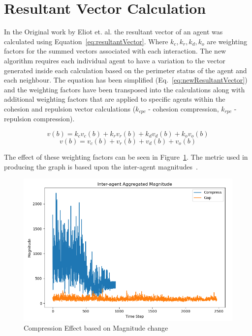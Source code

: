 \documentclass[12pt,a4paper]{article}
\begin{document}
\section{Resultant Vector Calculation}\label{resultantVector}
In the Original work by Eliot et. al. the resultant vector of an agent was calculated using Equation~\ref{eq:resultantVector}. Where $k_c,k_r,k_d,k_o$ are weighting factors for the summed vectors associated with each interaction. The new algorithm requires each individual agent to have a variation to the vector generated inside each calculation based on the perimeter status of the agent and each neighbour. The equation has been simplified (Eq.~\ref{eq:newResultantVector}) and the weighting factors have been transposed into the calculations along with additional weighting factors that are applied to specific agents within the cohesion and repulsion vector calculations ($k_{cpc}$ - cohesion compression, $k_{rpc}$ - repulsion compression).

\begin{equation}\label{eq:resultantVector}
	v(b) = k_cv_c(b) + k_rv_r(b) + k_dv_d(b) + k_ov_o(b)
\end{equation}
\begin{equation}\label{eq:newResultantVector}
	v(b) = v_c(b) + v_r(b) + v_d(b) + v_o(b)
\end{equation}

The effect of these weighting factors can be seen in Figure~\ref{fig:compressioneffect1}. The metric used in producing the graph is based upon the inter-agent magnitudes~\cite{eliot2018metric}.

\begin{figure}[H]
	\centering
	\includegraphics[width=0.75\linewidth]{figures/CompressionEffect1}
	\caption[Compression Effect]{Compression Effect based on Magnitude change}
	\label{fig:compressioneffect1}
\end{figure}
\end{document}

